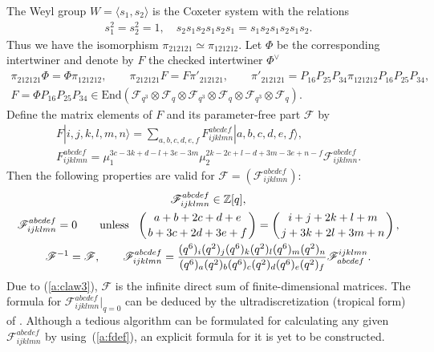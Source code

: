 \documentclass[pdftex]{sigma}
\begin{document}
The Weyl group $W =\langle s_1, s_2 \rangle$ is the Coxeter system
with the relations
\begin{gather*}
s_1^2=s_2^2=1,\quad
s_2s_1s_2s_1s_2s_1 = s_1s_2s_1s_2s_1s_2.
\end{gather*}
Thus we have the isomorphism
$\pi_{212121} \simeq \pi_{121212}$.
Let $\Phi$ be the corresponding intertwiner and denote by $F$
the checked intertwiner $\Phi^\vee$
\begin{gather}
 \pi_{212121} \Phi = \Phi\pi_{121212},\qquad
\pi_{212121} F = F \pi'_{212121},\qquad
\pi'_{212121}
= P_{16}P_{25}P_{34}\pi_{121212}P_{16}P_{25}P_{34},\nonumber
\\
F = \Phi  P_{16}P_{25}P_{34}\in
\mathrm{End}(\mathcal{F}_{q^3}\otimes
\mathcal{F}_{q}\otimes
\mathcal{F}_{q^3}\otimes
\mathcal{F}_{q}\otimes
\mathcal{F}_{q^3}\otimes
\mathcal{F}_{q}).\label{a:fdef}
\end{gather}
Def\/ine the matrix elements of $F$ and its parameter-free part
$\mathscr{F}$ by
\begin{gather*}
F |i,j,k,l,m,n \rangle=
\sum_{a,b,c,d,e,f}F^{abcdef}_{ijklmn}|a,b,c,d,e,f \rangle,\\
F^{a b c d e f}_{i j k l m n} =
\mu_1^{3c-3k+d-l+3e-3m}
\mu_2^{2k-2c+l-d+3m-3e+n-f}
\mathscr{F}^{a b c d e f}_{i j k l m n}.
\end{gather*}
Then the following properties are valid for
$\mathscr{F} = (\mathscr{F}^{abcdef}_{ijklmn})$:
\begin{gather}
\mathscr{F}^{abcdef}_{ijklmn} \in \mathbb{Z}[q],\nonumber\\
\mathscr{F}^{abcdef}_{ijklmn}=0 \qquad \mathrm{unless}\ \
\left({a + b + 2c + d + e \atop b + 3c + 2d + 3e + f}\right)=
\left({i + j + 2k + l + m\atop j + 3k + 2l + 3m + n}\right),
\label{a:claw3}\\
\mathscr{F}^{-1} = \mathscr{F},\qquad
\mathscr{F}^{abcdef}_{ijklmn}
=\frac{(q^6)_i(q^2)_j(q^6)_k(q^2)_l(q^6)_m(q^2)_n}
{(q^6)_a(q^2)_b(q^6)_c(q^2)_d(q^6)_e(q^2)_f}
\mathscr{F}^{ijklmn}_{abcdef}.
\label{a:fprop}
\end{gather}
Due to (\ref{a:claw3}), $\mathscr{F}$ is the inf\/inite direct sum
of f\/inite-dimensional matrices.
The formula for $\mathscr{F}^{abcdef}_{ijklmn}|_{q=0}$
can be deduced by the ultradiscretization (tropical form) of \cite[Theorem~3.1(c)]{BZ97}.
Although a tedious algorithm can be formulated
for calculating any given $\mathscr{F}^{abcdef}_{ijklmn}$ by using~(\ref{a:fdef}),
an explicit formula for it is yet to be constructed.
\end{document}
